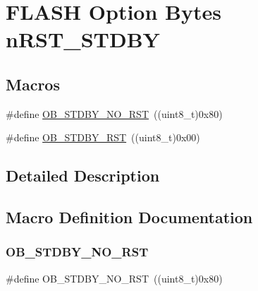 \hypertarget{group___f_l_a_s_h_ex___option___bytes__n_r_s_t___s_t_d_b_y}{}\section{F\+L\+A\+SH Option Bytes n\+R\+S\+T\+\_\+\+S\+T\+D\+BY}
\label{group___f_l_a_s_h_ex___option___bytes__n_r_s_t___s_t_d_b_y}
\subsection*{Macros}
\begin{DoxyCompactItemize}
\item 
\#define \hyperlink{group___f_l_a_s_h_ex___option___bytes__n_r_s_t___s_t_d_b_y_gad776ed7b3b9a98013aac9976eedb7e94}{O\+B\+\_\+\+S\+T\+D\+B\+Y\+\_\+\+N\+O\+\_\+\+R\+ST}~((uint8\+\_\+t)0x80)
\item 
\#define \hyperlink{group___f_l_a_s_h_ex___option___bytes__n_r_s_t___s_t_d_b_y_ga69451a6f69247528f58735c9c83499ce}{O\+B\+\_\+\+S\+T\+D\+B\+Y\+\_\+\+R\+ST}~((uint8\+\_\+t)0x00)
\end{DoxyCompactItemize}


\subsection{Detailed Description}


\subsection{Macro Definition Documentation}
\mbox{\label{group___f_l_a_s_h_ex___option___bytes__n_r_s_t___s_t_d_b_y_gad776ed7b3b9a98013aac9976eedb7e94}} 
\subsubsection{\texorpdfstring{O\+B\+\_\+\+S\+T\+D\+B\+Y\+\_\+\+N\+O\+\_\+\+R\+ST}{OB\_STDBY\_NO\_RST}}
{\footnotesize\ttfamily \#define O\+B\+\_\+\+S\+T\+D\+B\+Y\+\_\+\+N\+O\+\_\+\+R\+ST~((uint8\+\_\+t)0x80)}

